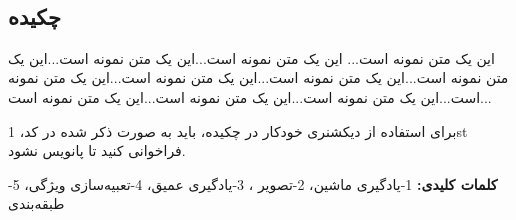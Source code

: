 
\setcounter{page}{1}
\thispagestyle{empty}

~\vfill

\subsection*{چکیده}
\begin{small}
\baselineskip=0.7cm

این یک متن نمونه است... این یک متن نمونه است...این یک متن نمونه است...این یک متن نمونه است...این یک متن نمونه است...این یک متن نمونه است...این یک متن نمونه است...این یک متن نمونه است...این یک متن نمونه است...این یک متن نمونه است...

برای استفاده از دیکشنری خودکار در چکیده، باید به صورت ذکر شده در کد، \gls*{1st}  فراخوانی کنید تا پانویس نشود.


\vspace*{0.7 cm}
\noindent\textbf{کلمات کلیدی:}
1-یادگیری ماشین، 2-تصویر ، 3-یادگیری عمیق، 4-تعبیه‌سازی ویژگی، 5-طبقه‌بندی
\end{small}